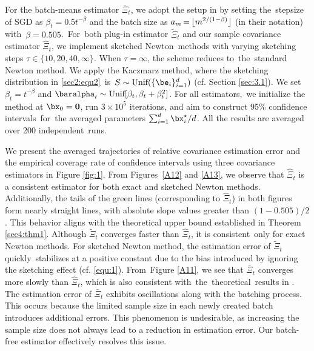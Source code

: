For the batch-means estimator $\bar{\Xi}_t$, we adopt the setup in \cite{Zhu2021Online} by setting the~stepsize of SGD as $\beta_t = 0.5t ^{-\beta}$ and the batch size as $a_m \hskip-1pt =\hskip-1pt  \lfloor m^{2/(1-\beta)}\rfloor$ (in their notation) with~\mbox{$\beta = 0.505$}.~For~both plug-in estimator $\tilde{\Xi}_t$ and our sample covariance estimator $\hat{\Xi}_t$, we implement sketched Newton~methods with varying sketching steps $\tau\in\{10,20,40,\infty\}$. When $\tau=\infty$, the scheme reduces to~the~\mbox{standard} Newton method. We apply the Kaczmarz method, where the sketching distribution in \eqref{sec2:equ2}~is~$S\sim \text{Unif}(\{\be_i\}_{i=1}^d)$ (cf. Section \ref{sec:3.1}). We set $\beta_t=t^{-\beta}$ and $\baralpha_t\sim\text{Unif}[\beta_t,\beta_t+\beta_t^2]$. For all estimators,~we initialize the method at $\bx_0=\boldsymbol{0}$, run $3\times 10^5$ iterations, and aim to construct 95\% confidence intervals~for~the averaged parameters $\sum_{i=1}^d\bx^{\star}_i/d$. All the results are averaged over 200 independent~runs.\;


We present the averaged trajectories of relative covariance estimation error and the empirical coverage rate of confidence intervals using three covariance estimators in Figure \ref{fig:1}.
From Figures~\ref{A12} and \ref{A13}, we observe that $\hat{\Xi}_t$ is a consistent estimator for both exact and sketched Newton methods. Additionally, the tails of the green lines (corresponding to $\hat{\Xi}_t$) in both figures form nearly straight lines, with absolute slope values greater than $(1-0.505)/2$. This behavior aligns with the theoretical upper bound established in Theorem \ref{sec4:thm1}. 
Although $\tilde{\Xi}_t$ converges faster than $\hat{\Xi}_t$, it is consistent~only for exact Newton methods. For sketched Newton method, the estimation error of $\tilde{\Xi}_t$ quickly~stabilizes at a positive constant due to the bias introduced by ignoring the sketching effect (cf. \eqref{equ:1}). 
From~Figure \ref{A11}, we see that $\bar{\Xi}_t$ converges more slowly than $\hat{\Xi}_t$, which is also consistent with~the~theoretical~results in \cite{Zhu2021Online}. The estimation error of $\bar{\Xi}_t$ exhibits oscillations along with the batching process. This occurs because the limited sample size in each newly created batch introduces additional errors. This phenomenon is undesirable, as increasing the sample size does not always lead to a reduction in estimation error. Our batch-free estimator effectively resolves this issue.



